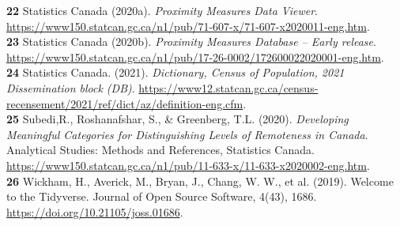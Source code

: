 \documentclass[11pt, a4paper]{article}
\begin{document}
\noindent\textbf{22} Statistics Canada (2020a). \textit{Proximity Measures Data Viewer}. \sloppy\url{https://www150.statcan.gc.ca/n1/pub/71-607-x/71-607-x2020011-eng.htm}. \\

\noindent\textbf{23} Statistics Canada (2020b). \textit{Proximity Measures Database – Early release}. \sloppy\url{https://www150.statcan.gc.ca/n1/pub/17-26-0002/172600022020001-eng.htm}. \\



\noindent\textbf{24} Statistics Canada. (2021). \textit{Dictionary, Census of Population, 2021  Dissemination block (DB)}. \sloppy\url{https://www12.statcan.gc.ca/census-recensement/2021/ref/dict/az/definition-eng.cfm}. \\

\noindent\textbf{25} Subedi,R., Roshanafshar, S., \& Greenberg, T.L. (2020). \textit{Developing Meaningful Categories for Distinguishing Levels of Remoteness in Canada}. Analytical Studies: Methods and References, Statistics Canada. \sloppy\url{https://www150.statcan.gc.ca/n1/pub/11-633-x/11-633-x2020002-eng.htm}. \\


\noindent\textbf{26} Wickham, H., Averick, M., Bryan, J., Chang, W. W., et al. (2019). Welcome to the Tidyverse. Journal of Open Source Software, 4(43), 1686. \sloppy\url{https://doi.org/10.21105/joss.01686}. \\
\end{document}

